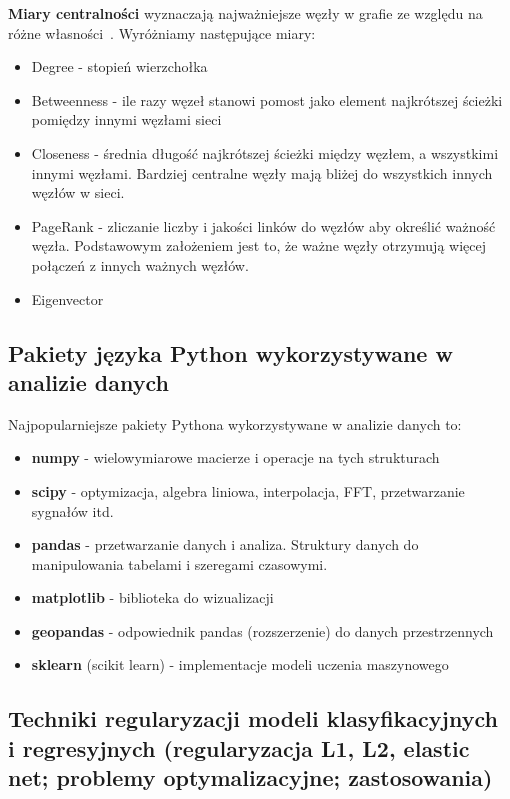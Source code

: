 \documentclass[wi]{zut}
\begin{document}
\textbf{Miary centralności} wyznaczają najważniejsze węzły w grafie ze względu na różne własności~\cite{Jankowski2020}. Wyróżniamy następujące miary:

\begin{itemize}
    \item Degree - stopień wierzchołka
    \item Betweenness - ile razy węzeł stanowi pomost jako element najkrótszej ścieżki pomiędzy innymi węzłami sieci
    \item Closeness - średnia długość najkrótszej ścieżki między węzłem, a wszystkimi innymi węzłami. Bardziej centralne węzły mają bliżej do wszystkich innych węzłów w sieci.
    \item PageRank - zliczanie liczby i jakości linków do węzłów aby określić ważność węzła. Podstawowym założeniem jest to, że ważne węzły otrzymują więcej połączeń z innych ważnych węzłów.
    \item Eigenvector
\end{itemize}

\subsection{Pakiety języka Python wykorzystywane w analizie danych}

Najpopularniejsze pakiety Pythona wykorzystywane w analizie danych to:

\begin{itemize}
    \item \textbf{numpy} - wielowymiarowe macierze i operacje na tych strukturach
    \item \textbf{scipy} - optymizacja, algebra liniowa, interpolacja, FFT, przetwarzanie sygnałów itd.
    \item \textbf{pandas} - przetwarzanie danych i analiza. Struktury danych do manipulowania tabelami i szeregami czasowymi.
    \item \textbf{matplotlib} - biblioteka do wizualizacji
    \item \textbf{geopandas} - odpowiednik pandas (rozszerzenie) do danych przestrzennych
    \item \textbf{sklearn} (scikit learn) - implementacje modeli uczenia maszynowego
\end{itemize}

\subsection{Techniki regularyzacji modeli klasyfikacyjnych i regresyjnych (regularyzacja L1, L2, elastic net; problemy optymalizacyjne; zastosowania)}
\end{document}

